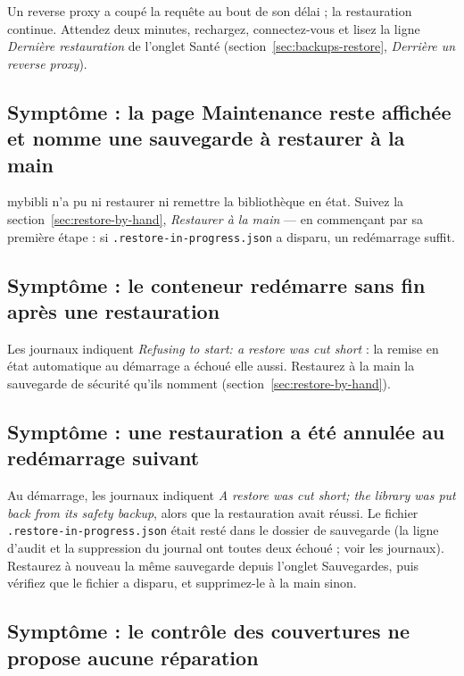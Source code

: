 Un reverse proxy a coupé la requête au bout de son délai ; la
restauration continue. Attendez deux minutes, rechargez, connectez-vous
et lisez la ligne \emph{Dernière restauration} de l'onglet Santé
(section~\ref{sec:backups-restore}, \emph{Derrière un reverse proxy}).

\subsection*{Symptôme : la page Maintenance reste affichée et nomme une sauvegarde à restaurer à la main}

mybibli n'a pu ni restaurer ni remettre la bibliothèque en état. Suivez
la section~\ref{sec:restore-by-hand}, \emph{Restaurer à la main} --- en
commençant par sa première étape : si
\texttt{.restore-\allowbreak in-\allowbreak progress.json} a disparu, un redémarrage suffit.

\subsection*{Symptôme : le conteneur redémarre sans fin après une restauration}

Les journaux indiquent \emph{Refusing to start: a restore was cut
short} : la remise en état automatique au démarrage a échoué elle
aussi. Restaurez à la main la sauvegarde de sécurité qu'ils nomment
(section~\ref{sec:restore-by-hand}).

\subsection*{Symptôme : une restauration a été annulée au redémarrage suivant}

Au démarrage, les journaux indiquent \emph{A restore was cut short; the
library was put back from its safety backup}, alors que la restauration
avait réussi. Le fichier \texttt{.restore-\allowbreak in-\allowbreak progress.json} était resté
dans le dossier de sauvegarde (la ligne d'audit et la suppression du
journal ont toutes deux échoué ; voir les journaux). Restaurez à nouveau la même
sauvegarde depuis l'onglet Sauvegardes, puis vérifiez que le fichier a
disparu, et supprimez-le à la main sinon.

\subsection*{Symptôme : le contrôle des couvertures ne propose aucune réparation}

